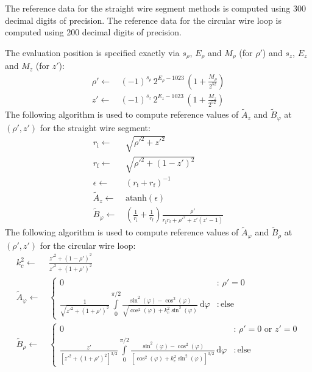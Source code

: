 The reference data for the straight wire segment methods
is computed using 300 decimal digits of precision.
The reference data for the circular wire loop
is computed using 200 decimal digits of precision.

The evaluation position is specified exactly
via $s_\rho$, $E_\rho$ and $M_\rho$ (for $\rho'$)
and $s_z$, $E_z$ and $M_z$ (for $z'$):
\begin{align}
 \rho' \leftarrow&\, (-1)^{s_\rho} \, 2^{E_\rho - 1023} \, \left(1 + \frac{M_\rho}{2^{52}}  \right) \nonumber \\
    z' \leftarrow&\, (-1)^{s_z   } \, 2^{E_z    - 1023} \, \left(1 + \frac{M_z   }{2^{52}}  \right)
\end{align}
The following algorithm is used to compute reference values
of $\tilde{A}_z$ and $\tilde{B}_\varphi$ at~$(\rho', z')$
for the straight wire segment:
\begin{align}
  r_\mathrm{i}  \leftarrow&\, \sqrt{ {\rho'}^2 + {z'}^2 } \nonumber \\
  r_\mathrm{f}  \leftarrow&\, \sqrt{ {\rho'}^2 + \left(1 - z'\right)^2 } \label{alg:sws_ref} \\
  \epsilon \leftarrow&\, \left( r_\mathrm{i} + r_\mathrm{f} \right)^{-1} \nonumber \\
  \tilde{A}_z \leftarrow&\, \textrm{atanh} (\epsilon) \nonumber \\
  \tilde{B}_\varphi \leftarrow&\, \left(\frac{1}{r_\mathrm{i}} + \frac{1}{r_\mathrm{f}} \right) \frac{\rho'}{r_\mathrm{i} r_\mathrm{f} + {\rho'}^2 + z' (z' - 1)} \nonumber
\end{align}
The following algorithm is used to compute reference values
of $\tilde{A}_\varphi$ and $\tilde{B}_\rho$ at~$(\rho', z')$
for the circular wire loop:
\begin{align}
 k_c^2 \leftarrow&\, \frac{{z'}^2 + \left(1 - \rho'\right)^2}{{z'}^2 + \left(1 + \rho'\right)^2} \nonumber \\
 \tilde{A}_\varphi \leftarrow&\,
 \begin{cases}
   0 &:\, \rho' = 0 \\
   \frac{1}{\sqrt{{z'}^2 + \left(1 + \rho'\right)^2}}
                                 \int\limits_0^{\pi/2}
                                   \frac{\sin^2(\varphi) - \cos^2(\varphi)}
                                        {\sqrt{\cos^2(\varphi) + k_c^2 \sin^2(\varphi)}} \,\mathrm{d}\varphi &:\, \textrm{else}
 \end{cases} \label{eqn:A_phi_ref} \\
 \tilde{B}_\rho \leftarrow&\,
 \begin{cases}
   0 &:\, \rho' = 0 \textrm{ or } z' = 0 \\
   \frac{z'}{\left[{z'}^2 + \left(1 + \rho'\right)^2\right]^{3/2}}
                                 \int\limits_0^{\pi/2}
                                   \frac{\sin^2(\varphi) - \cos^2(\varphi)}
                                        {\left[\cos^2(\varphi) + k_c^2 \sin^2(\varphi)\right]^{3/2}} \,\mathrm{d}\varphi &:\, \textrm{else}
 \end{cases}
\end{align}
